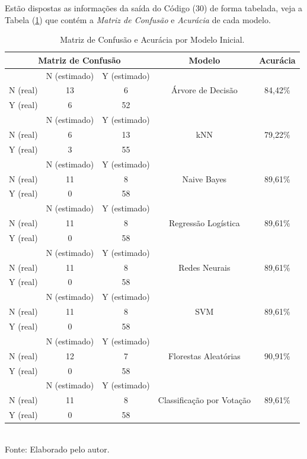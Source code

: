 \documentclass[a4paper,12pt]{article} %
\begin{document}
Estão dispostas as informações da saída do Código (30) de forma tabelada, veja a Tabela (\ref{tab:4}) que contém a \textit{Matriz de Confusão} e \textit{Acurácia} de cada modelo.
\begin{table}[H]
    \centering
    \caption{Matriz de Confusão e Acurácia por Modelo Inicial.} 
    \begin{tabular}{ccc|c|c} \\ \hline
         \multicolumn{3}{c|}{Matriz de Confusão} & Modelo & Acurácia \\\hline
         & N (estimado) & Y (estimado) & \multirow{3}{*}{Árvore de Decisão} & \multirow{3}{*}{84,42\%} \\
         N (real) & 13 & 6 &  & \\
         Y (real) & 6 & 52 &  & \\ \hline
         & N (estimado) & Y (estimado) & \multirow{3}{*}{kNN} & \multirow{3}{*}{79,22\%}\\
         N (real) & 6 & 13 &  & \\
         Y (real) & 3 & 55 &  & \\ \hline
         & N (estimado) & Y (estimado) & \multirow{3}{*}{Naive Bayes} & \multirow{3}{*}{89,61\%}\\
         N (real) & 11 & 8 &  & \\
         Y (real) & 0 & 58 &  & \\ \hline
         & N (estimado) & Y (estimado) & \multirow{3}{*}{Regressão Logística} & \multirow{3}{*}{89,61\%}\\
         N (real) & 11 & 8 &  & \\
         Y (real) & 0 & 58 &  & \\  \hline
         & N (estimado) & Y (estimado) & \multirow{3}{*}{Redes Neurais} & \multirow{3}{*}{89,61\%}\\
         N (real) & 11 & 8 &  & \\
         Y (real) & 0 & 58 &  & \\ \hline
         & N (estimado) & Y (estimado) & \multirow{3}{*}{SVM} & \multirow{3}{*}{89,61\%}\\
         N (real) & 11 & 8 &  & \\
         Y (real) & 0 & 58 &  & \\ \hline
         & N (estimado) & Y (estimado) & \multirow{3}{*}{Florestas Aleatórias} & \multirow{3}{*}{90,91\%}\\
         N (real) & 12 & 7 &  & \\
         Y (real) & 0 & 58 &  & \\ \hline
         & N (estimado) & Y (estimado) & \multirow{3}{*}{Classificação por Votação} & \multirow{3}{*}{89,61\%}\\
         N (real) & 11 & 8 &  & \\
         Y (real) & 0 & 58 &  & \\ \hline\hline
    \end{tabular} \\
    \label{tab:4}
    Fonte: Elaborado pelo autor.
\end{table}
\end{document}
